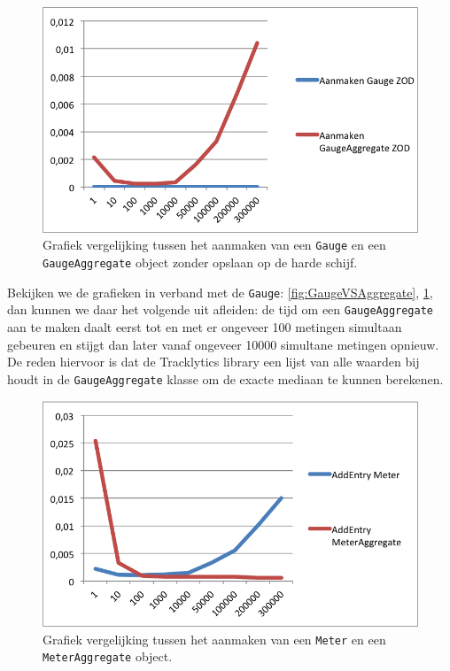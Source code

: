 \begin{figure}[h]
  \centering
  \includegraphics[scale=1.0]{Afbeeldingen/Evaluatie/GaugeVSAggregateZOD}
  \caption{Grafiek vergelijking tussen het aanmaken van een \texttt{Gauge} en een \texttt{GaugeAggregate} object zonder opslaan op de harde schijf.}
  \label{fig:GaugeVSAggregateZOD}
\end{figure}



Bekijken we de grafieken in verband met de \texttt{Gauge}: \ref{fig:GaugeVSAggregate}, \ref{fig:GaugeVSAggregateZOD}, dan kunnen we daar het volgende uit afleiden: de tijd om een \texttt{GaugeAggregate} aan te maken daalt eerst tot en met er ongeveer 100 metingen simultaan gebeuren en stijgt dan later vanaf ongeveer 10000 simultane metingen opnieuw. De reden hiervoor is dat de Tracklytics library een lijst van alle waarden bij houdt in de \texttt{GaugeAggregate} klasse om de exacte mediaan te kunnen berekenen. \\

\begin{figure}[h]
  \centering
  \includegraphics[scale=1.0]{Afbeeldingen/Evaluatie/MeterVSAggregate}
  \caption{Grafiek vergelijking tussen het aanmaken van een \texttt{Meter} en een \texttt{MeterAggregate} object.}
  \label{fig:MeterVSAggregate}
\end{figure}

